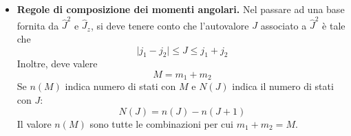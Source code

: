 \documentclass[11pt, a4paper]{scrartcl} %
\numberwithin{equation}{section}
\theoremstyle{style2}
\theoremstyle{style1}
\begin{document}
\begin{multicols}{2}
\begin{itemize}
				La base di $M_y$ \`e:
				\begin{equation}
					\left\{ \frac{1}{2}\begin{pmatrix} 1 \\ i\sqrt{2} \\ -1 \end{pmatrix} , \ \frac{1}{\sqrt{2} } \begin{pmatrix} 1 \\0 \\ 1 \end{pmatrix} , \ \frac{1}{2}\begin{pmatrix} 1 \\ -i\sqrt{2} \\- 1 \end{pmatrix}  \right\} 
				\end{equation}
				con $\lambda = 1,0,-1$ rispettivamente.
				\item {\sffamily \bfseries Regole di composizione dei momenti angolari.} 
					Nel passare ad una base fornita da $\hat{J}^2$ e $\hat{J}_z$, si deve tenere conto che l'autovalore $J$ associato a $\hat{J}^2$ \`e tale che 
					\begin{equation}
						\lvert j_1-j_2 \rvert \le J\le j_1+j_2
					\end{equation}
					Inoltre, deve valere
					\begin{equation}
						M = m_1+m_2
					\end{equation}
					Se $n(M)$ indica numero di stati con $M$ e $N(J)$ indica il numero di stati con $J$:
					\begin{equation}
						N(J)= n(J) - n(J+1)
					\end{equation}
					Il valore $n(M)$ sono tutte le combinazioni per cui $m_1+m_2=M$.
	\end{itemize}
\end{multicols}
\end{document}
